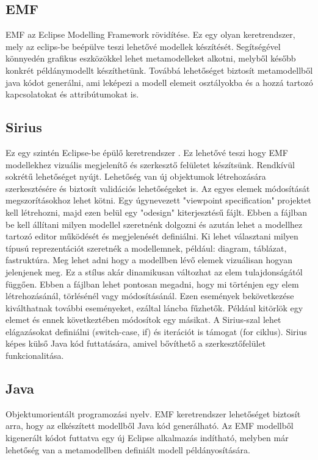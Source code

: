 \subsection{EMF}
\nocite{EMFtut}
EMF az Eclipse Modelling Framework \cite{EMF} rövidítése. Ez egy olyan keretrendszer, mely az eclips-be beépülve teszi lehetővé modellek készítését. Segítségével könnyedén grafikus eszközökkel lehet metamodelleket alkotni, melyből később konkrét példánymodellt készíthetünk. Továbbá lehetőséget biztosít metamodellből java kódot generálni, ami leképezi a modell elemeit osztályokba és a hozzá tartozó kapcsolatokat és attribútumokat is.

\subsection{Sirius}
\nocite{SiruisTutNagyASz}
\nocite{SiruisTutStart}
\nocite{SiruisTutAdv}
Ez egy szintén Eclipse-be épülő keretrendszer \cite{Sirius}. Ez lehetővé teszi hogy EMF modellekhez vizuális megjelenítő és szerkesztő felületet készítsünk. Rendkívül sokrétű lehetőséget nyújt. Lehetőség van új objektumok létrehozására szerkesztésére és biztosít validációs lehetőségeket is. Az egyes elemek módosítását megszorításokhoz lehet kötni. Egy úgynevezett "viewpoint specification" projektet kell létrehozni, majd ezen belül egy "odesign" kiterjesztésű fájlt. Ebben a fájlban be kell állítani milyen modellel szeretnénk dolgozni és azután lehet a modellhez tartozó editor működését és megjelenését definiálni. Ki lehet választani milyen típusú reprezentációt szeretnék a modellemnek, például: diagram, táblázat, fastruktúra. Meg lehet adni hogy a modellben lévő elemek vizuálisan hogyan jelenjenek meg. Ez a stílus akár dinamikusan változhat az elem tulajdonságától függően. Ebben a fájlban lehet pontosan megadni, hogy mi történjen egy elem létrehozásánál, törlésénél vagy módosításánál. Ezen események bekövetkezése kiválthatnak további eseményeket, ezáltal láncba fűzhetők. Például kitörlök egy elemet és ennek következtében módosítok egy másikat. A Sirius-szal lehet elágazásokat definiálni (switch-case, if) és iterációt is támogat (for ciklus). Sirius képes külső Java kód futtatására, amivel bővíthető a szerkesztőfelület funkcionalitása.

\subsection{Java}
Objektumorientált programozási nyelv. EMF keretrendszer lehetőséget biztosít arra, hogy az elkészített modellből Java kód generálható. Az EMF modellből kigenerált kódot futtatva egy új Eclipse alkalmazás indítható, melyben már lehetőség van a metamodellben definiált modell példányosítására. 

